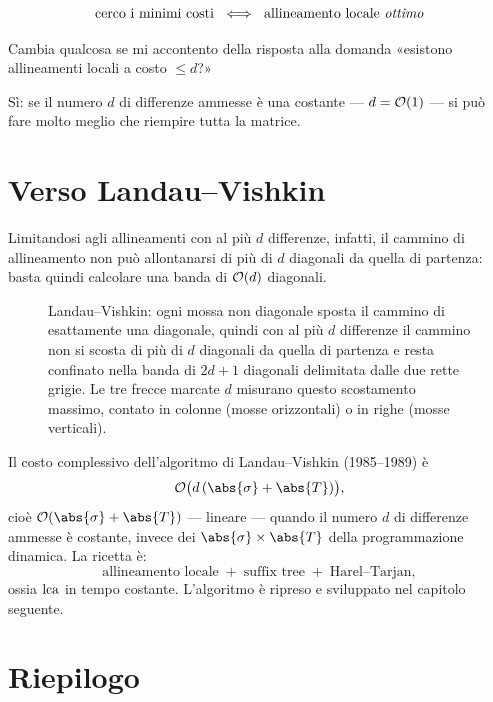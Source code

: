 \[
  \text{cerco i minimi costi}\ \iff\ \text{allineamento locale \emph{ottimo}}
\]

\begin{domanda}
  Cambia qualcosa se mi accontento della risposta alla domanda «esistono
  allineamenti locali a costo $\le d$?»
\end{domanda}

Sì: se il numero $d$ di differenze ammesse è una costante --- $d=\mathcal{O}(1)$ ---
si può fare molto meglio che riempire tutta la matrice.


\section{Verso Landau--Vishkin}

%
Limitandosi agli allineamenti con al più $d$ differenze, infatti, il cammino di
allineamento non può allontanarsi di più di $d$ diagonali da quella di
partenza: basta quindi calcolare una banda di $\mathcal{O}(d)$ diagonali.

\begin{figure}[H]
  \centering
  
  \caption{Landau--Vishkin: ogni mossa non diagonale sposta il cammino di
  esattamente una diagonale, quindi con al più $d$ differenze il cammino non si
  scosta di più di $d$ diagonali da quella di partenza e resta confinato nella
  banda di $2d+1$ diagonali delimitata dalle due rette grigie. Le tre frecce
  marcate $d$ misurano questo scostamento massimo, contato in colonne (mosse
  orizzontali) o in righe (mosse verticali).}
  \label{fig:landau-vishkin-banda}
\end{figure}

Il costo complessivo dell'algoritmo di Landau--Vishkin (1985--1989) è
\[
  \Oh\bigl(d\,(\abs{\sigma}+\abs{T})\bigr),
\]
cioè $\Oh(\abs{\sigma}+\abs{T})$ --- lineare --- quando il numero $d$ di
differenze ammesse è costante, invece dei $\abs{\sigma}\times\abs{T}$ della
programmazione dinamica. La ricetta è:
\[
  \text{allineamento locale} \;+\; \text{suffix tree} \;+\; \text{Harel--Tarjan},
\]
ossia $\operatorname{lca}$ in tempo costante. L'algoritmo è ripreso e sviluppato nel capitolo
seguente.


\section{Riepilogo}

